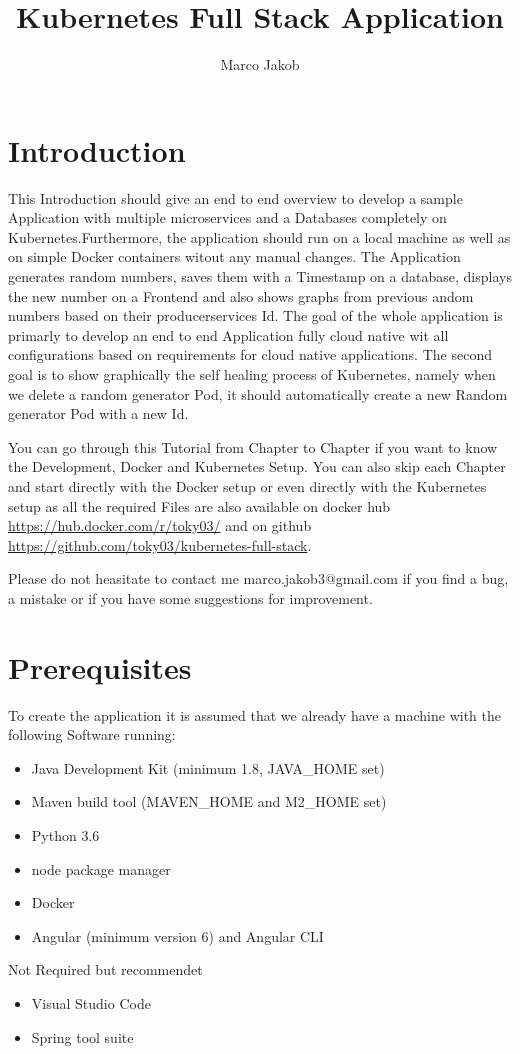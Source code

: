 \documentclass{article}
\author{Marco Jakob}
\title{Kubernetes Full Stack Application}
\begin{document}
\maketitle
\newpage
\tableofcontents
\newpage

\section{Introduction}
This Introduction should give an end to end overview to develop a sample Application with multiple microservices and a Databases completely on Kubernetes.Furthermore, the application should run on a local machine as well as on simple Docker containers witout any manual changes.
The Application generates random numbers, saves them with a Timestamp on a database, displays the new number on a Frontend and also shows graphs from previous andom numbers based on their producerservices Id.
The goal of the whole application is primarly to develop an end to end Application fully cloud native wit all configurations based on requirements for cloud native applications. The second goal is to show graphically the self healing process of Kubernetes, namely when we delete a random generator Pod, it should automatically create a new Random generator Pod with a new Id.

You can go through this Tutorial from Chapter to Chapter if you want to know the Development, Docker and Kubernetes Setup. You can also skip each Chapter and start directly with the Docker setup or even directly with the Kubernetes setup as all the required Files are also available on docker hub \url{https://hub.docker.com/r/toky03/} and on github \url{https://github.com/toky03/kubernetes-full-stack}.

Please do not heasitate to contact me marco.jakob3@gmail.com if you find a bug, a mistake or if you have some suggestions for improvement.

\section{Prerequisites}
To create the application it is assumed that we already have a machine with the following Software running:
\begin{itemize}
\item Java Development Kit (minimum 1.8, JAVA\_HOME set) 
\item Maven build tool (MAVEN\_HOME and M2\_HOME set)
\item Python 3.6
\item node package manager
\item Docker
\item Angular (minimum version 6) and Angular CLI
\end{itemize}
Not Required but recommendet
\begin{itemize}
\item Visual Studio Code
\item Spring tool suite
\end{itemize}
\newpage

\newpage
\end{document}
